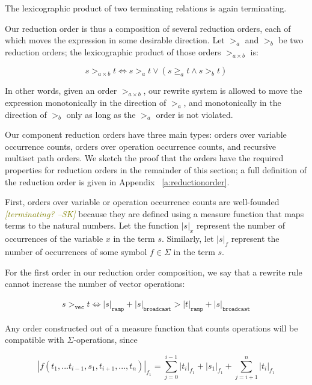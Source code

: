 \documentclass[sigplan,10pt,review,anonymous]{acmart}\settopmatter{printfolios=true,printccs=false,printacmref=false}
\newcommand{\sak}[1]{\textcolor{olive}{\textit{[{#1} --SK]}}}
\begin{document}
\begin{theorem}
The lexicographic product of two terminating relations is again terminating.
\end{theorem}

Our reduction order is thus a composition of several reduction orders, each of
which moves the expression in some desirable direction. Let $>_a$ and $>_b$ be
two reduction orders; the lexicographic product of those orders $>_{a \times b}$
is:

\[
s >_{a \times b} t \iff s >_a t \vee (s \geq_a t \wedge s >_b t)
\] 

In other words, given an order $>_{a \times b}$, our rewrite system is allowed
to move the expression monotonically in the direction of $>_a$, and
monotonically in the direction of $>_b$ only as long as the $>_a$ order is not
violated.

Our component reduction orders have three main types: orders over variable
occurrence counts, orders over operation occurrence counts, and recursive
multiset path orders. We sketch the proof that the orders have the required
properties for reduction orders in the remainder of this section; a full
definition of the reduction order is given in Appendix ~\ref{a:reductionorder}.

First, orders over variable or operation occurrence counts are well-founded \sak{terminating?}
because they are defined using a measure function that maps terms to the natural
numbers. Let the function $|s|_x$ represent the number of occurrences of the
variable $x$ in the term $s$. Similarly, let $|s|_f$ represent the number of
occurrences of some symbol $f \in \Sigma$ in the term $s$.

For the first order in our reduction order composition, we say that a rewrite
rule cannot increase the number of vector operations:

\begin{equation}
\begin{split}
s >_{\texttt{vec}} t \Leftrightarrow |s|_{\texttt{ramp}} + |s|_{\texttt{broadcast}} > |t|_{\texttt{ramp}} + |s|_{\texttt{broadcast}}
\end{split}
\end{equation}

Any order constructed out of a measure function that counts operations will be compatible with $\Sigma$-operations, since 

\[
|f(t_1,...t_{i-1},s_1,t_{i+1},...,t_n)|_{f_1} = \sum_{j=0}^{i-1} |t_i|_{f_1} + |s_1|_{f_1} + \sum_{j=i+1}^{n} |t_i|_{f_1}
\]
\end{document}
